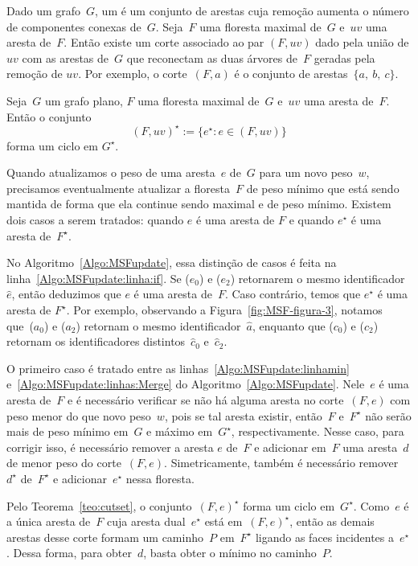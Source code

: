 Dado um grafo~$G$, um  é um conjunto de arestas cuja remoção aumenta o número de componentes conexas de~$G$.
Seja~$F$ uma floresta maximal de~$G$ e~$uv$ uma aresta de~$F$.
Então existe um corte associado ao par $(F, uv)$ dado pela união de $uv$ com as arestas de~$G$ que reconectam as duas árvores de~$F$ geradas pela remoção de $uv$.
Por exemplo, o corte~$(F, a)$ é o conjunto de arestas~$\{a,~b,~c\}$.

\begin{theorem}
\label{teo:cutset}
Seja~$G$ um grafo plano, $F$ uma floresta maximal de~$G$ e~$uv$ uma aresta de~$F$.
Então o conjunto
$$
(F, uv)^\star := \{e^\star:e\in (F, uv)\}
$$
forma um ciclo em $G^\star$.
\end{theorem}

Quando atualizamos o peso de uma aresta~$e$ de~$G$ para um novo peso~$w$, precisamos eventualmente atualizar a floresta~$F$ de peso mínimo que está sendo mantida de forma que ela continue sendo maximal e de peso mínimo.
Existem dois casos a serem tratados: quando $e$ é uma aresta de $F$ e quando $e^\star$ é uma aresta de~$F^\star$.

No Algoritmo~\ref{Algo:MSFupdate}, essa distinção de casos é feita na linha~\ref{Algo:MSFupdate:linha:if}.
Se \LCOFindNode($e_0$) e \LCOFindNode($e_2$) retornarem o mesmo identificador~$\hat e$, então deduzimos que $e$ é uma aresta de~$F$.
Caso contrário, temos que $e^\star$ é uma aresta de $F^\star$.
Por exemplo, observando a Figura~\ref{fig:MSF-figura-3}, notamos que~\LCOFindNode($a_0$) e \LCOFindNode($a_2$) retornam o mesmo identificador~$\hat a$,
enquanto que \LCOFindNode($c_0$) e \LCOFindNode($c_2$) retornam os identificadores distintos~$\hat c_0$ e~$\hat c_2$.

O primeiro caso é tratado entre as linhas~\ref{Algo:MSFupdate:linhamin} e~\ref{Algo:MSFupdate:linhas:Merge} do Algoritmo~\ref{Algo:MSFupdate}.
Nele~$e$ é uma aresta de~$F$ e é necessário verificar se não há alguma aresta no corte~$(F, e)$ com peso menor do que novo peso~$w$, pois se tal aresta existir, então~$F$ e~$F^\star$ não serão mais de peso mínimo em~$G$ e máximo em~$G^\star$, respectivamente.
Nesse caso, para corrigir isso, é necessário remover a aresta $e$ de~$F$ e adicionar em~$F$ uma aresta~$d$ de menor peso do corte~$(F, e)$.
Simetricamente, também é necessário remover $d^\star$ de~$F^\star$ e adicionar~$e^\star$ nessa floresta.

Pelo Teorema~\ref{teo:cutset}, o conjunto~$(F, e)^\star$ forma um ciclo em~$G^\star$.
Como~$e$ é a única aresta de~$F$ cuja aresta dual~$e^\star$ está em~$(F, e)^\star$, então as demais arestas desse corte formam um caminho~$P$ em~$F^\star$ ligando as faces incidentes a~$e^\star$.
Dessa forma, para obter~$d$, basta obter o mínimo no caminho~$P$.

